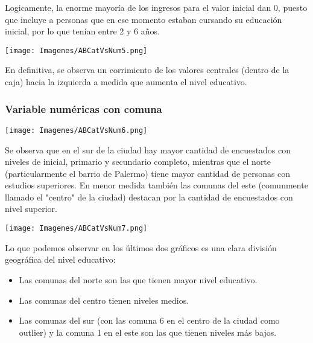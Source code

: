 \documentclass[a4paper]{article}
\begin{document}
            Logicamente, la enorme mayoría de los ingresos para el valor inicial dan 0, puesto que incluye a personas que en ese momento estaban cursando su educación inicial, por lo que tenían entre 2 y 6 años.

            \begin{center}
                \texttt{[image: Imagenes/ABCatVsNum5.png]}
            \end{center}

            En definitiva, se observa un corrimiento de los valores centrales (dentro de la caja) hacia la izquierda a medida que aumenta el nivel educativo.

        \subsubsection{Variable numéricas con comuna}

            \begin{center}
                \texttt{[image: Imagenes/ABCatVsNum6.png]}
            \end{center}

            Se observa que en el sur de la ciudad hay  mayor cantidad de encuestados con niveles de inicial, primario y secundario completo, mientras que el norte (particularmente el barrio de Palermo) tiene mayor cantidad de personas con estudios superiores. En menor medida también las comunas del este (comunmente llamado el "centro" de la ciudad) destacan por la cantidad de encuestados con nivel superior.

            \begin{center}
                \texttt{[image: Imagenes/ABCatVsNum7.png]}
            \end{center}

            Lo que podemos observar en los últimos dos gráficos es una clara división geográfica del nivel educativo:
            \begin{itemize}
                \item Las comunas del norte son las que tienen mayor nivel educativo.
                \item Las comunas del centro tienen niveles medios.
                \item Las comunas del sur (con las comuna 6 en el centro de la ciudad como outlier) y la comuna 1 en el este son las que tienen niveles más bajos.
            \end{itemize}
            
\end{document}
